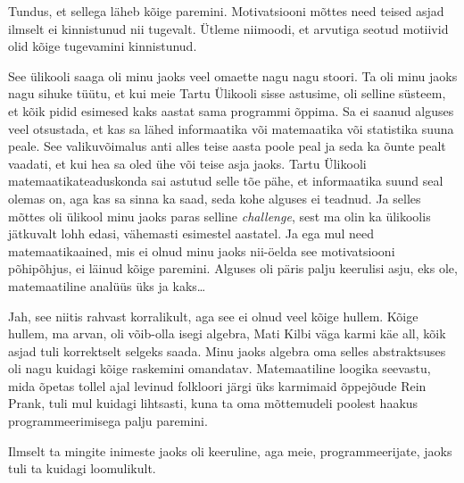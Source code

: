 
Tundus, et sellega läheb kõige paremini. Motivatsiooni mõttes need teised asjad ilmselt ei kinnistunud nii tugevalt. Ütleme niimoodi, et arvutiga seotud motiivid olid kõige tugevamini kinnistunud. 


See ülikooli saaga oli minu jaoks veel omaette nagu nagu stoori. Ta oli minu jaoks nagu sihuke tüütu, et 
kui meie  Tartu Ülikooli sisse astusime, oli selline süsteem, et kõik pidid esimesed kaks aastat sama programmi õppima. Sa ei saanud alguses veel otsustada, et kas sa lähed informaatika või matemaatika või  statistika suuna peale. See valikuvõimalus anti alles teise aasta poole peal ja seda ka õunte pealt vaadati, et kui hea sa oled ühe või teise asja jaoks. Tartu Ülikooli matemaatikateaduskonda sai astutud selle tõe pähe, et informaatika suund seal olemas on, aga kas sa sinna ka saad, seda kohe alguses ei teadnud. Ja selles mõttes oli ülikool minu jaoks paras selline \emph{challenge}, sest ma olin ka ülikoolis jätkuvalt  lohh edasi, vähemasti esimestel aastatel. Ja ega mul need matemaatikaained, mis ei olnud minu jaoks  nii-öelda see motivatsiooni põhipõhjus, ei läinud kõige paremini. Alguses oli päris palju keerulisi asju, eks ole, matemaatiline analüüs üks ja kaks\ldots 


Jah, see niitis  rahvast korralikult, aga see ei olnud veel kõige hullem. Kõige hullem, ma arvan, oli võib-olla isegi algebra, Mati Kilbi väga karmi käe all, kõik asjad tuli korrektselt selgeks saada. Minu jaoks algebra oma selles abstraktsuses oli nagu kuidagi kõige raskemini omandatav. Matemaatiline loogika seevastu, mida õpetas tollel ajal levinud folkloori järgi üks karmimaid õppejõude Rein Prank, tuli mul kuidagi lihtsasti, kuna ta oma mõttemudeli poolest haakus programmeerimisega palju paremini. 


Ilmselt ta mingite inimeste jaoks oli keeruline, aga meie, programmeerijate, jaoks tuli ta kuidagi loomulikult. 


